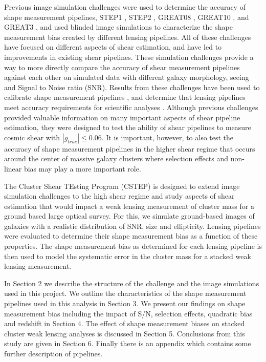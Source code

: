 \documentclass[useAMS,usenatbib]{mn2e}
\begin{document}
\indent Previous image simulation challenges were used to determine
the accuracy of shape measurement pipelines, STEP1 \citep{STEP1},
STEP2 \citep{STEP2}, GREAT08 \citep{GREAT08}, GREAT10
\citep{GREAT10}, and GREAT3 \citep{great3}, and used blinded image
simulations to characterize the shape measurement bias created by
different lensing pipelines. All of these challenges have focused on
different aspects of shear estimation, and have led to
improvements in existing shear pipelines. These simulation challenges provide a way to
more directly compare the accuracy of shear measurement pipelines against each other
on simulated data with different galaxy morphology, seeing and Signal
to Noise ratio (SNR). Results from these challenges have been
used to calibrate shape measurement pipelines \citep[e.g.][]{Apple},
and determine that lensing pipelines meet accuracy requirements for scientific
analyses \citep[e.g.][]{Berge}. Although previous challenges provided valuable information on many important
aspects of shear pipeline estimation, they were designed to test the ability of shear
pipelines to measure cosmic shear with $|g_{true}| \leq 0.06
$. It is important, however, to also test the accuracy of shape measurement
pipelines in the higher shear regime that occurs around the center of
massive galaxy clusters where selection effects and non-linear bias
may play a more important role.

\indent
The Cluster Shear TEsting Program (CSTEP) is designed to extend image
simulation challenges to the high shear regime and study aspects of
shear estimation that would impact a weak lensing measurement of
cluster mass for a ground based large optical survey. For this, we
simulate ground-based images of galaxies with a realistic
distribution of SNR, size and ellipticity. Lensing pipelines
were evaluated to determine their shape measurement bias as a
function of these properties. The shape measurement bias as 
determined for each lensing pipeline is then used to model the 
systematic error in the cluster mass for a stacked weak lensing measurement.

\indent
In Section 2 we describe the structure of the challenge and the image simulations used in this
project. We outline the characteristics of the shape
measurement pipelines used in this analysis in Section 3. We present
our findings on shape measurement bias including the impact of S/N, selection
effects, quadratic bias and redshift in Section 4. The
effect of shape measurement biases on stacked cluster weak lensing
analyses is discussed in Section 5.  Conclusions from this study are 
given in Section 6.  Finally there is an appendix which contains some further
description of pipelines. 
\end{document}
